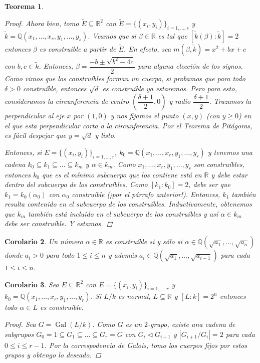 \documentclass[12pt]{book}
\newtheorem{teo}{Teorema}[section]
\newtheorem{cor}[teo]{Corolario}
\theoremstyle{definition}
\newcommand{\RR}{\mathbb{R}}      %
\newcommand{\QQ}{\mathbb{Q}}
\DeclareMathOperator{\Gal}{Gal}
\begin{document}
\begin{teo}
\begin{proof}
Ahora bien, tomo $\widetilde{E}\subseteq\RR^2$ con $\widetilde{E} = \{(x_i,y_i)\}_{i=1,\ldots ,s}$ y $\widetilde{k}=\QQ(x_1,\ldots, x_s,y_1,\ldots , y_s)$. Veamos que si $\beta\in\RR$ es tal que $[\widetilde{k}(\beta):\widetilde{k}]=2$ entonces $\beta$ es construíble a partir de $\widetilde{E}$. En efecto, sea $m(\beta,\widetilde{k})=x^2 +bx+c$ con $b,c\in\widetilde{k}$. Entonces, $\beta = \dfrac{-b\pm\sqrt{b^2 -4c}}{2}$ para alguna elección de los signos. Como vimos que los construíbles forman un cuerpo, si probamos que para todo $\delta > 0 $ construíble, entonces $\sqrt{d}$ es construíble ya estaremos. Pero para esto, consideramos la circunferencia de centro $(\dfrac{\delta+1}{2},0)$ y radio $\dfrac{\delta+1}{2}$. Trazamos la perpendicular al eje $x$ por $(1,0)$ y nos fijamos el punto $(x,y)$ (con $y\geq 0$) en el que esta perpendicular corta a la circunferencia. Por el Teorema de Pitágoras, es fácil despejar que $y=\sqrt{d}$ y listo.

Entonces, si $E=\{(x_i,y_i)\}_{i=1,\ldots , r}$, $k_0=\QQ(x_1,\ldots , x_r,y_1,\ldots , y_r)$ y tenemos una cadena $k_0\subseteq k_1\subseteq \ldots \subseteq k_m$ y $\alpha\in k_m$. Como $x_1,\ldots , x_r,y_1,\ldots ,y_r$ son construíbles, entonces $k_0$ que es el mínimo subcuerpo que los contiene está en $\RR$ y debe estar dentro del subcuerpo de los construíbles. Como $[k_1:k_0]=2$, debe ser que $k_1=k_0(\alpha_0)$ con $\alpha_0$ construíble (¡por el párrafo anterior!). Entonces, $k_1$ también resulta contenido en el subcuerpo de los construíbles. Inductivamente, obtenemos que $k_m$ también está incluído en el subcuerpo de los construíbles y así $\alpha\in k_m$ debe ser construíble. Y estamos.
\end{proof}
\end{teo}

\begin{cor}
Un número $\alpha\in\RR$ es construíble si y sólo si $\alpha\in \QQ(\sqrt{a_1},\ldots ,\sqrt{a_n})$ donde $a_i>0$ para todo $1\leq i\leq n$ y además $a_i\in\QQ(\sqrt{a_1},\ldots , \sqrt{a_{i-1}})$ para cada $1\leq i\leq n$.
\end{cor}

\begin{cor}
Sea $E\subseteq\RR^2$ con $E=\{(x_i,y_i)\}_{i=1,\ldots ,r}$ y $k_0=\QQ(x_1,\ldots , x_r,y_1,\ldots ,y_r)$. Si $L/k$ es normal, $L\subseteq \RR$ y $[L:k]=2^n$ entonces todo $\alpha\in L$ es construíble.
\begin{proof}
Sea $G=\Gal(L/k)$. Como $G$ es un $2$-grupo, existe una cadena de subgrupos $G_0=1\subseteq G_1\subseteq\ldots\subseteq G_r=G$ con $G_i\triangleleft G_{i+1}$ y $|G_{i+1}/G_i|=2$ para cada $0\leq i\leq r-1$. Por la correspodencia de Galois, tomo los cuerpos fijos por estos grupos y obtengo lo deseado.
\end{proof}
\end{cor}
\end{document}
